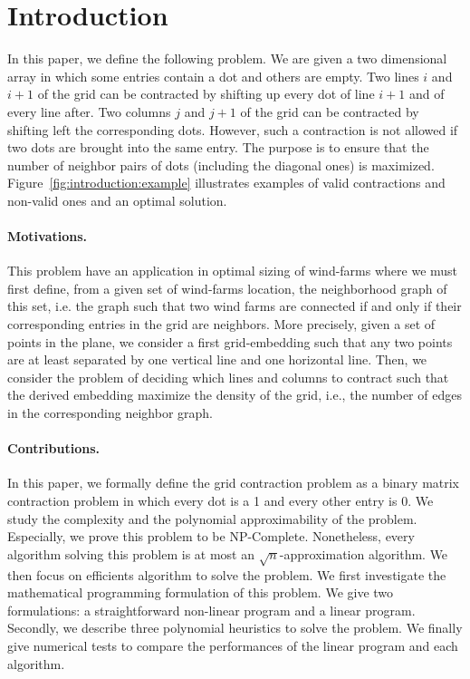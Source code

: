 \section{Introduction}
\label{sect:intro}


In this paper, we define the following problem. We are given a two dimensional array in which some entries contain a dot and others are empty. Two lines $i$ and $i+1$ of the grid can be contracted by shifting up every dot of line $i+1$ and of every line after. Two columns $j$ and $j+1$ of the grid can be contracted by shifting left the corresponding dots. However, such a contraction is not allowed if two dots are brought into the same entry. The purpose is to ensure that the number of neighbor pairs of dots (including the diagonal ones) is maximized. Figure~\ref{fig:introduction:example} illustrates examples of valid contractions and non-valid ones and an optimal solution.




\paragraph{Motivations. }
This problem have an application in optimal sizing of wind-farms \cite{Pillai2015} where we must first define, from a given set of wind-farms location, the neighborhood graph of this set, i.e. the graph such that two wind farms are connected if and only if their corresponding entries in the grid are neighbors. More precisely, given a set of points in the plane, we consider a first grid-embedding such that any two points are at least separated by one vertical line and one horizontal line. Then, we consider the problem of deciding which lines and columns to contract such that the derived embedding maximize the density of the grid, i.e., the number of edges in the corresponding neighbor graph.

\paragraph{Contributions. } In this paper, we formally define the grid contraction problem as a binary matrix contraction problem in which every dot is a 1 and every other entry is 0. We study the complexity and the polynomial approximability of the problem. Especially, we prove this problem to be NP-Complete. Nonetheless, every algorithm solving this problem is at most an $\sqrt{n}$-approximation algorithm. We then focus on efficients algorithm to solve the problem. We first investigate the mathematical programming formulation of this problem. We give two formulations: a straightforward non-linear program and a linear program.
Secondly, we describe three polynomial heuristics to solve the problem. We finally give numerical tests to compare the performances of the linear program and each algorithm. 

